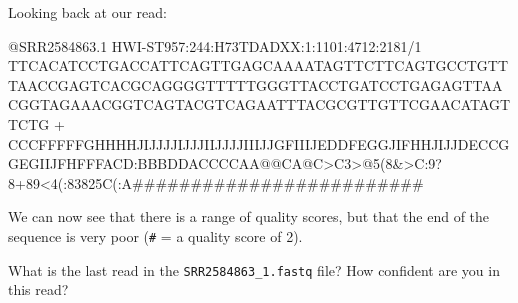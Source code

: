 \documentclass[
  letterpaper,
  DIV=11,
  numbers=noendperiod]{scrreprt}
\newenvironment{Shaded}{\begin{snugshade}}{\end{snugshade}}
\newcommand{\ErrorTok}[1]{\textcolor[rgb]{0.68,0.00,0.00}{#1}}
\newcommand{\ExtensionTok}[1]{\textcolor[rgb]{0.00,0.23,0.31}{#1}}
\newcommand{\NormalTok}[1]{\textcolor[rgb]{0.00,0.23,0.31}{#1}}
\newcommand{\OperatorTok}[1]{\textcolor[rgb]{0.37,0.37,0.37}{#1}}
\newcommand{\PreprocessorTok}[1]{\textcolor[rgb]{0.68,0.00,0.00}{#1}}
\begin{document}
Looking back at our read:

\begin{Shaded}
\begin{Highlighting}[]
\ExtensionTok{@SRR2584863.1}\NormalTok{ HWI{-}ST957:244:H73TDADXX:1:1101:4712:2181/1}
\ExtensionTok{TTCACATCCTGACCATTCAGTTGAGCAAAATAGTTCTTCAGTGCCTGTTTAACCGAGTCACGCAGGGGTTTTTGGGTTACCTGATCCTGAGAGTTAACGGTAGAAACGGTCAGTACGTCAGAATTTACGCGTTGTTCGAACATAGTTCTG}
\ExtensionTok{+}
\ExtensionTok{CCCFFFFFGHHHHJIJJJJIJJJIIJJJJIIIJJGFIIIJEDDFEGGJIFHHJIJJDECCGGEGIIJFHFFFACD:BBBDDACCCCAA@@CA@C}\OperatorTok{\textgreater{}}\NormalTok{C3}\OperatorTok{\textgreater{}}\NormalTok{@5}\ErrorTok{(}\ExtensionTok{8}\OperatorTok{\&\textgreater{}}\NormalTok{C:9}\PreprocessorTok{?}\NormalTok{8+89}\OperatorTok{\textless{}}\NormalTok{4}\ErrorTok{(}\ExtensionTok{:83825C}\ErrorTok{(}\ExtensionTok{:A\#\#\#\#\#\#\#\#\#\#\#\#\#\#\#\#\#\#\#\#\#\#\#\#\#}
\end{Highlighting}
\end{Shaded}

We can now see that there is a range of quality scores, but that the end
of the sequence is very poor (\texttt{\#} = a quality score of 2).

\begin{tcolorbox}[enhanced jigsaw, toptitle=1mm, breakable, bottomrule=.15mm, colback=white, toprule=.15mm, opacityback=0, bottomtitle=1mm, coltitle=black, opacitybacktitle=0.6, rightrule=.15mm, colframe=quarto-callout-caution-color-frame, titlerule=0mm, colbacktitle=quarto-callout-caution-color!10!white, title={Exercise}, left=2mm, leftrule=.75mm, arc=.35mm]

What is the last read in the \texttt{SRR2584863\_1.fastq} file? How
confident are you in this read?

\end{tcolorbox}
\end{document}
